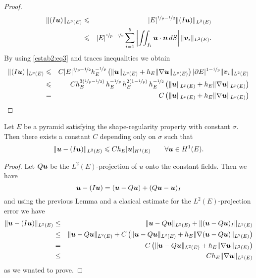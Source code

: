 \begin{proof}
\begin{eqnarray*}
\|(I\boldsymbol{u})\|_{L^p(E)}
&\leqslant& |E|^{{\nicefrac1p}-{\nicefrac12}}\|(I\boldsymbol{u})\|_{L^2(E)}\\
&\leqslant& |E|^{{\nicefrac1p}-{\nicefrac12}} \sum_{i=1}^5 
  \left|\iint_{f_i}\boldsymbol{u}\cdot\boldsymbol{n}\,dS\right|\|\boldsymbol{v}_i\|_{L^2(E)}.
\end{eqnarray*}
By using \eqref{estab2:eq3} and traces inequalities %
we obtain
\begin{eqnarray*}
\|(I\boldsymbol{u})\|_{L^p(E)} &\leqslant& C |E|^{{\nicefrac1p}-{\nicefrac12}} 
  h_E^{-{\nicefrac1p}}\left(\|\boldsymbol{u}\|_{L^p(E)}+h_E\|\nabla\boldsymbol{u}\|_{L^p(E)}\right)|\partial E|^{1-{\nicefrac1p}} \|\boldsymbol{v}_i\|_{L^2(E)}\\
&\leqslant& C h_E^{3\left({\nicefrac1p}-{\nicefrac12}\right)}\,h_E^{-{\nicefrac1p}}\,
  h_E^{2\left(1-{\nicefrac1p}\right)}\,h_E^{-{\nicefrac12}}
    \left(\|\boldsymbol{u}\|_{L^p(E)} + h_E\|\nabla\boldsymbol{u}\|_{L^p(E)}\right)\\
& = & C \left(\|\boldsymbol{u}\|_{L^p(E)} + h_E\|\nabla\boldsymbol{u}\|_{L^p(E)}\right)
\end{eqnarray*}



\end{proof}

\begin{proposition}\label{propErrorInterpolacionPiramidesTetraedros}
Let $E$ be a pyramid satisfying the shape-regularity property with constant $\sigma$.
Then there exists a constant $C$ depending only on $\sigma$ such that 
\[
\|\boldsymbol{u}-(I\boldsymbol{u})\|_{L^2(E)}\leqslant C h_E|\boldsymbol{u}|_{H^1(E)} \qquad \forall \boldsymbol{u}\in H^1(E).
\]
\end{proposition}
\begin{proof} Let $Q\boldsymbol{u}$ be the $L^2(E)$-projection of $u$ onto the constant fields. Then we have
\[
\boldsymbol{u}-(I\boldsymbol{u}) = (\boldsymbol{u} - Q\boldsymbol{u}) + (Q\boldsymbol{u}-\boldsymbol{u})_I
\]
and using the previous Lemma and a clasical estimate for the $L^2(E)$-projection error we have
\begin{eqnarray*}
\|\boldsymbol{u}-(I\boldsymbol{u})\|_{L^2(E)} &\le& \|\boldsymbol{u} - Q\boldsymbol{u}\|_{L^2(E)} + \|(\boldsymbol{u}-Q\boldsymbol{u})_I\|_{L^2(E)}\\ &\le& \|\boldsymbol{u} - Q\boldsymbol{u}\|_{L^2(E)} + C \left(\|\boldsymbol{u}-Q\boldsymbol{u}\|_{L^2(E)} + h_E\|\nabla(\boldsymbol{u}-Q\boldsymbol{u})\|_{L^2(E)}\right)\\ &=& C\left(\|\boldsymbol{u}-Q\boldsymbol{u}\|_{L^2(E)} + h_E\|\nabla\boldsymbol{u}\|_{L^2(E)}\right)\\&\le& Ch_E\|\nabla\boldsymbol{u}\|_{L^2(E)}
\end{eqnarray*}
as we wnated to prove.
\end{proof}


